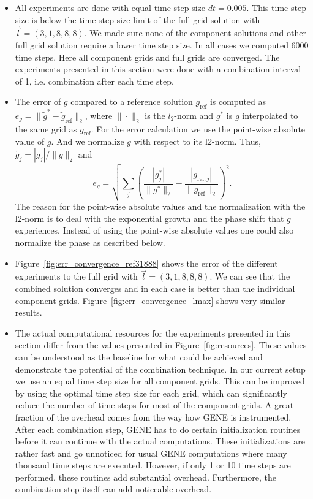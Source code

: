 \documentclass{scrartcl}
\begin{document}
\begin{itemize}
	\item All experiments are done with equal time step size $dt = 0.005$. This time step size is below the time step size limit of the full grid solution with $\vec{l} = (3,1,8,8,8)$. We made sure none of the component solutions and other full grid solution require a lower time step size. In all cases we computed 6000 time steps. Here all component grids and full grids are converged.
	The experiments presented in this section were done with a combination interval of 1, i.e. combination after each time step.
	\item The error of $g$ compared to a reference solution $g_\text{ref}$ is computed as $e_g = \|\tilde{g}^*-\tilde{g}_\text{ref}\|_2$, where $\|\cdot\|_2$ is the $l_2$-norm and $g^*$ is $g$ interpolated to the same grid as $g_\text{ref}$. For the error calculation we use the point-wise absolute value of $g$. And we normalize $g$ with respect to its l2-norm. 
	Thus, $\tilde{g_j} = |g_j| / \|g\|_2$ and 
	\begin{equation}
		e_g = \sqrt{\sum_j \left( \frac{|g_j^*|}{\|g^*\|_2} - \frac{ |g_{\text{ref},j}| }{ \| g_\text{ref} \|_2 } \right)^2 }.
	\end{equation}
	The reason for the point-wise absolute values and the normalization with the l2-norm is to deal with the exponential growth and the phase shift that $g$ experiences.
	Instead of using the point-wise absolute values one could also normalize the phase as described below.
	 
	\item Figure~\ref{fig:err_convergence_ref31888} shows the error of the different experiments to the full grid with $\vec{l} = (3,1,8,8,8)$. We can see that the combined solution converges and in each case is better than the individual component grids.
	Figure~\ref{fig:err_convergence_lmax} shows very similar results.

	\item The actual computational resources for the experiments presented in this section differ from the values presented in Figure~\ref{fig:resources}. These values can be understood as the baseline for what could be achieved and demonstrate the potential of the combination technique. 
	In our current setup we use an equal time step size for all component grids. This can be improved by using the optimal time step size for each grid, which can significantly reduce the number of time steps for most of the component grids.
	A great fraction of the overhead comes from the way how GENE is instrumented. After each combination step, GENE has to do certain initialization routines before it can continue with the actual computations. 
	These initializations are rather fast and go unnoticed for usual GENE computations where many thousand time steps are executed. However, if only 1 or 10 time steps are performed, these routines add substantial overhead.
	Furthermore, the combination step itself can add noticeable overhead. 
	

\end{itemize}
\end{document}
